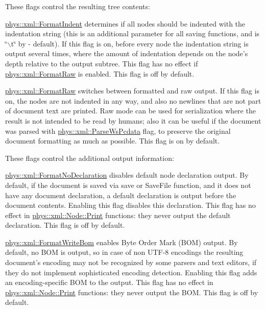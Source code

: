 These flags control the resulting tree contents:
\begin{DoxyItemize}
\item \hyperlink{namespacephys_1_1xml_afaad0b8f59b5f103218ed5cb39b1bbde}{phys::xml::FormatIndent} determines if all nodes should be indented with the indentation string (this is an additional parameter for all saving functions, and is \char`\"{}$\backslash$t\char`\"{} by -\/ default). If this flag is on, before every node the indentation string is output several times, where the amount of indentation depends on the node's depth relative to the output subtree. This flag has no effect if \hyperlink{namespacephys_1_1xml_a6f6696cbdc48011817adad7978e83976}{phys::xml::FormatRaw} is enabled. This flag is off by default.
\item \hyperlink{namespacephys_1_1xml_a6f6696cbdc48011817adad7978e83976}{phys::xml::FormatRaw} switches between formatted and raw output. If this flag is on, the nodes are not indented in any way, and also no newlines that are not part of document text are printed. Raw mode can be used for serialization where the result is not intended to be read by humans; also it can be useful if the document was parsed with \hyperlink{namespacephys_1_1xml_a48c0da99d1ed62b1a4984293e64828c6}{phys::xml::ParseWsPcdata} flag, to preserve the original document formatting as much as possible. This flag is on by default.
\end{DoxyItemize}

These flags control the additional output information:
\begin{DoxyItemize}
\item \hyperlink{namespacephys_1_1xml_aee4ccb3535945d4808a0cf6abe4cb050}{phys::xml::FormatNoDeclaration} disables default node declaration output. By default, if the document is saved via save or SaveFile function, and it does not have any document declaration, a default declaration is output before the document contents. Enabling this flag disables this declaration. This flag has no effect in \hyperlink{classphys_1_1xml_1_1Node_adbe10968a804a94552e1dc8223744406}{phys::xml::Node::Print} functions: they never output the default declaration. This flag is off by default.
\item \hyperlink{namespacephys_1_1xml_a76a253f60deb94ef39c255064afb6040}{phys::xml::FormatWriteBom} enables Byte Order Mark (BOM) output. By default, no BOM is output, so in case of non UTF-\/8 encodings the resulting document's encoding may not be recognized by some parsers and text editors, if they do not implement sophisticated encoding detection. Enabling this flag adds an encoding-\/specific BOM to the output. This flag has no effect in \hyperlink{classphys_1_1xml_1_1Node_adbe10968a804a94552e1dc8223744406}{phys::xml::Node::Print} functions: they never output the BOM. This flag is off by default.
\end{DoxyItemize}

